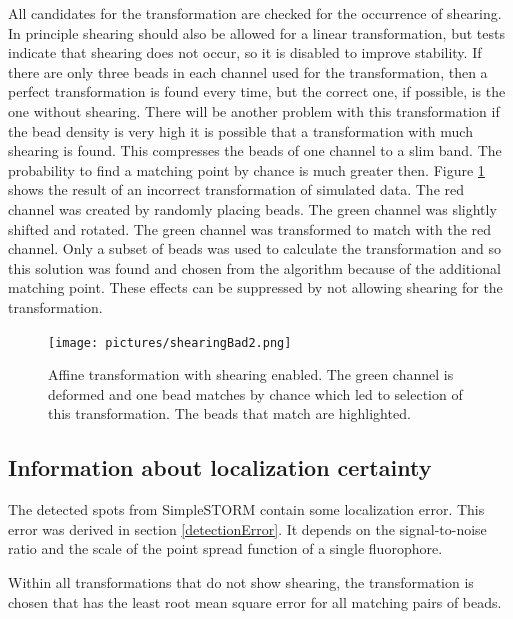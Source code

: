 All candidates for the transformation are checked for the occurrence of shearing.
In principle shearing should also be allowed for a linear transformation, but tests
indicate that shearing does not occur, so it is disabled to improve stability. \newline 
If there are only
three beads in each channel used for the transformation, then a perfect transformation is found every time,
but the correct one, if possible, is the one without shearing. There will be another problem with this transformation if the bead density is very high it is possible that a transformation with much shearing is found. This compresses the beads of one channel to a slim band. The probability to find a matching point by chance is much greater then. \newline
Figure \ref{badshearing} shows the result of an incorrect transformation of simulated data. The red channel was created by randomly placing beads. The green channel was slightly shifted and rotated. The green channel was transformed to match with the red channel. Only a subset of beads was used to calculate the transformation and so this solution was found and chosen from the algorithm because of the additional matching point.\newline
These effects can be suppressed by not allowing shearing for the transformation.

\begin{figure}
\centering
\texttt{[image: pictures/shearingBad2.png]}
\caption{Affine transformation with shearing enabled. The green channel is deformed and one bead matches by chance which led to selection of this transformation. The beads that match are highlighted.}
\label{badshearing}
\end{figure}
\subsection{Information about localization certainty}
The detected spots from SimpleSTORM contain some localization error. This error was derived in section \ref{detectionError}. It depends on the signal-to-noise ratio and the scale of the point spread function of a single fluorophore.

Within all transformations that do not show shearing, the transformation is chosen that has the least root mean square error for all matching pairs of beads.

